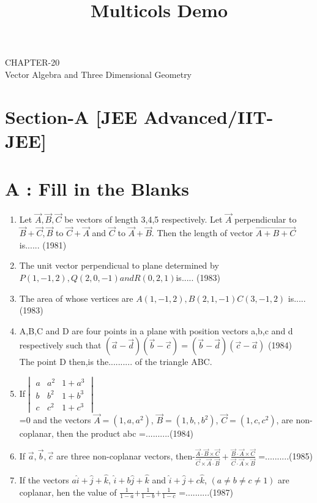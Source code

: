 \documentclass[12pt]{article}
\title{Multicols Demo}
\providecommand{\brak}[1]{\ensuremath{\left(#1\right)}}
\begin{document}
\begin{center}
\textbf\large{CHAPTER-20 \\ Vector Algebra and
 Three Dimensional Geometry}

\end{center}
\fi
\section*{Section-A    [JEE Advanced/IIT-JEE]}
\section*{A    :  Fill in the Blanks}
\begin{enumerate}
\item Let $\vec{A},\vec{B},\vec{C}$ be vectors of length 3,4,5 respectively. Let $\vec{A}$ perpendicular to $\vec{B}+\vec{C},\vec{B}$ to $\vec{C}+\vec{A}$ and $\vec{C}$ to $\vec{A}+\vec{B}$. Then  the length of vector $\vec{A+B+C}$ is......     (1981)
\item The unit vector perpendicual to plane determined by $P(1,-1,2),Q(2,0,-1) and R(0,2,1)$is.....     (1983)
\item The area of whose vertices are $A(1,-1,2),B(2,1,-1)C(3,-1,2)$ is.....(1983)
\item A,B,C and D are four points in a plane with position vectors a,b,c and d respectively such that   $\brak{\vec{a}-\vec{d}}\brak{\vec{b}-\vec{c}}=\brak{\vec{b}-\vec{d}}\brak{\vec{c}-\vec{a}}$   (1984)\\
The point D then,is the.......... of the triangle ABC.
\item If$\begin{vmatrix}
 a & a^2 & 1+a^3\\
 b & b^2 & 1+b^3\\
 c & c^2 & 1+c^3
\end{vmatrix}$ \\ =0 and the vectors $\vec{A}=(1,a,a^2)$, $\vec{B}=(1,b,,b^2)$, $\vec{C}=(1,c,c^2)$, are non-coplanar, then the product abc =..........(1984)
\item If $\vec{a}, \vec{b}, \vec{c}$ are three non-coplanar vectors, then-$\frac{\vec{A}\cdot\vec{B}\times\vec{C}}{\vec{C}\times\vec{A}\cdot\vec{B}}+\frac{\vec{B}\cdot\vec{A}\times\vec{C}}{\vec{C}\cdot\vec{A}\times\vec{B}}$ =..........(1985)
\item If the vectors $a\hat{i}+\hat{j}+\hat{k}$, $\hat{i}+b\hat{j}+\hat{k}$ and $\hat{i}+\hat{j}+c\hat{k}$, $(a\neq b\neq c\neq 1)$ are coplanar, hen the value of $\frac{1}{1-a}$+$\frac{1}{1-b}$+$\frac{1}{1-c}$ =..........(1987)

\end{enumerate}
\end{document}
